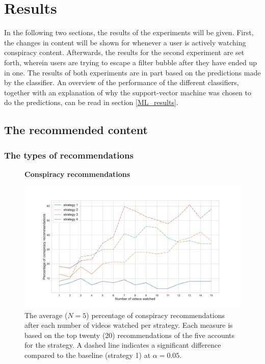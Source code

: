 \documentclass[../main.tex]{subfiles}
\begin{document}
\section{Results}
In the following two sections, the results of the experiments will be given. First, the changes in content 
will be shown for whenever a user is actively watching conspiracy content. Afterwards, the results for the
second experiment are set forth, wherein users are trying to escape a filter bubble after they have ended 
up in one. The results of both experiments are in part based on the predictions made by the classifier. An 
overview of the performance of the different classifiers, together with an explanation of why the 
support-vector machine was chosen to do the predictions, can be read in section \ref{ML_results}.

\subsection{The recommended content}
\subsubsection{The types of recommendations}
\begin{figure}[h]
  \textbf{Conspiracy recommendations}\par\medskip
  \centering
  \includegraphics[keepaspectratio, width=\textwidth]{images/conspiracy_recs.pdf}
  \caption[]{The average ($N=5$) percentage of conspiracy recommendations after each number of videos watched per strategy. Each measure is based on the top twenty (20) recommendations of the five accounts for the strategy. A dashed line indicates a significant difference compared to the baseline (strategy 1) at $\alpha = 0.05$.\footnotemark}
  \label{fig:con_recs}
\end{figure}
\end{document}

